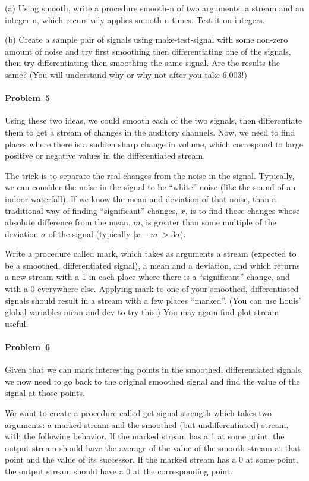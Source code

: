 (a) Using {\cf smooth}, write a
procedure {\cf smooth-n} of two arguments, a {\cf stream} and an integer
{\cf n}, which recursively applies {\cf smooth} n times. Test it on {\cf
integers}.

(b) Create a sample pair of signals using {\cf
make-test-signal} with some non-zero amount of noise and try first
smoothing then differentiating one of the signals, then try 
differentiating then smoothing the same signal.  Are the results the
same?  (You will understand why or why not after you take 6.003!)


\paragraph{Problem~5}
Using these two ideas, we could smooth each of the two
signals, then
differentiate them to get a stream of changes in the auditory channels.
Now,  we need to find places where there is a sudden sharp change in
volume, which correspond to large positive or negative values in the
differentiated stream.

The trick is to separate the real changes from
the noise in the signal.    Typically, we
can consider the noise in the signal to be
``white'' noise (like the sound of an indoor waterfall).
If we know the mean
and deviation of that noise, than a traditional way of finding 
``significant'' changes, $x$, is to find those changes whose absolute
difference from the mean, $m$,  is greater than some multiple of the
deviation $\sigma$ of
the signal (typically $|x-m|>3\sigma$).

Write a procedure called {\cf
mark}, which takes as 
arguments a stream (expected to be a smoothed, differentiated signal), a
mean and a deviation, and  which returns a new stream with a 1 in each
place where there is a ``significant'' change, and with a 0 everywhere
else.  
Applying {\cf mark} to one of your smoothed, differentiated signals
should result in a stream with a few places ``marked''.  (You can use
Louis' global variables {\cf mean} and {\cf dev} to try this.) You may again
find {\cf plot-stream} useful.

\paragraph{Problem~6}  Given that we can mark interesting points in the
smoothed, differentiated signals, we now need to go back to the original
smoothed signal and find the value of the signal at those points.

We
want to create a procedure called {\cf get-signal-strength} which
takes two arguments:
a marked stream and the smoothed (but undifferentiated) stream, with
the following behavior.  If the marked stream has a 1 at some point, the
output stream should have the average of the value of the smooth stream
at that point and the value of its successor.  If the marked stream has a 0 at
some point, the output stream should have a 0 at the corresponding
point.

